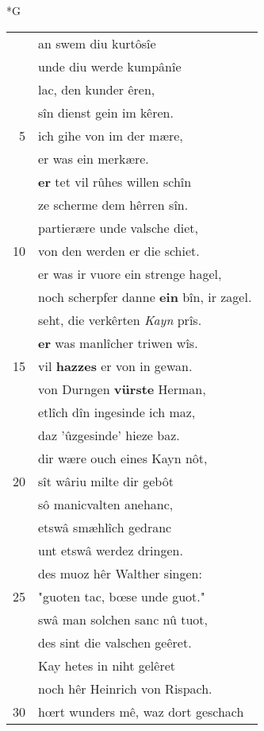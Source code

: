 \documentclass[8pt,a4paper,notitlepage]{article}
\begin{document}
\begin{table}[ht]
\begin{minipage}[t]{0.5\linewidth}
\small
\begin{center}*G
\end{center}
\begin{tabular}{rl}
 & an swem diu kurtôsîe\\ 
 & unde diu werde kumpânîe\\ 
 & lac, den kunder êren,\\ 
 & sîn dienst gein im kêren.\\ 
5 & ich gihe von im der mære,\\ 
 & er was ein merkære.\\ 
 & \textbf{er} tet vil rûhes willen schîn\\ 
 & ze scherme dem hêrren sîn.\\ 
 & partierære unde valsche diet,\\ 
10 & von den werden er die schiet.\\ 
 & er was ir vuore ein strenge hagel,\\ 
 & noch scherpfer danne \textbf{ein} bîn, ir zagel.\\ 
 & seht, die verkêrten \textit{Kayn} prîs.\\ 
 & \textbf{er} was manlîcher triwen wîs.\\ 
15 & vil \textbf{hazzes} er von in gewan.\\ 
 & von Durngen \textbf{vürste} Herman,\\ 
 & etlîch dîn ingesinde ich maz,\\ 
 & daz 'ûzgesinde' hieze baz.\\ 
 & dir wære ouch eines Kayn nôt,\\ 
20 & sît wâriu milte dir gebôt\\ 
 & sô manicvalten anehanc,\\ 
 & etswâ smæhlîch gedranc\\ 
 & unt etswâ werdez dringen.\\ 
 & des muoz hêr Walther singen:\\ 
25 & "guoten tac, bœse unde guot."\\ 
 & swâ man solchen sanc nû tuot,\\ 
 & des sint die valschen geêret.\\ 
 & Kay hetes in niht gelêret\\ 
 & noch hêr Heinrich von Rispach.\\ 
30 & hœrt wunders mê, waz dort geschach\\ 
\end{tabular}

\end{minipage}
\end{table}
\end{document}

